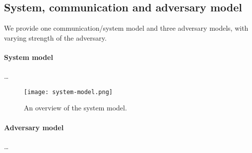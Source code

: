 \subsection{System, communication and adversary model}%
\label{adversary-model}

We provide one communication/system model and three adversary models, with 
varying strength of the adversary.

\paragraph{System model}

\dots

\begin{figure}
  \centering
  \texttt{[image: system-model.png]}
  \caption{\label{fig:system-model}%
    An overview of the system model.
  }
\end{figure}

\paragraph{Adversary model}

\dots
